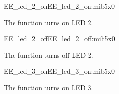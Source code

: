 \begin{function_nopb2}{EE\_led\_2\_on}{EE_led_2_on:mib5x0}
  
  \begin{fundescription}
    The function turns on LED 2.
  \end{fundescription}
  
  
  
\end{function_nopb2}

\begin{function_nopb2}{EE\_led\_2\_off}{EE_led_2_off:mib5x0}
  
  \begin{fundescription}
    The function turns off LED 2.
  \end{fundescription}
  
  
  
\end{function_nopb2}

\begin{function_nopb2}{EE\_led\_3\_on}{EE_led_3_on:mib5x0}
  
  \begin{fundescription}
    The function turns on LED 3.
  \end{fundescription}
  
  
  
\end{function_nopb2}

